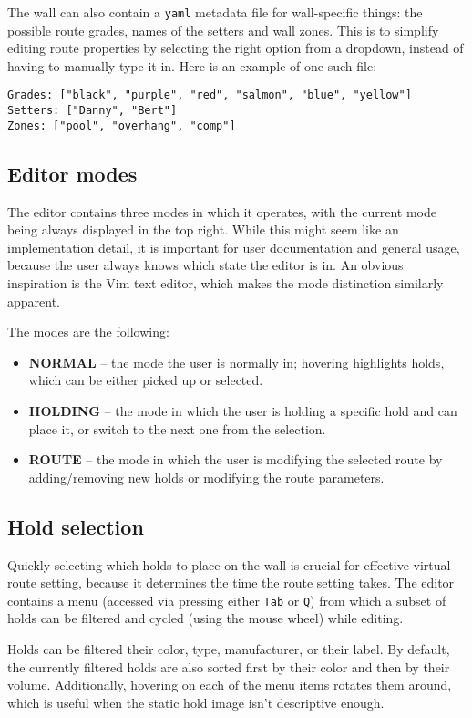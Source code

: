 The wall can also contain a \verb|yaml| metadata file for wall-specific things: the possible route grades, names of the setters and wall zones.
This is to simplify editing route properties by selecting the right option from a dropdown, instead of having to manually type it in.
Here is an example of one such file:

\begin{verbatim}
Grades: ["black", "purple", "red", "salmon", "blue", "yellow"]
Setters: ["Danny", "Bert"]
Zones: ["pool", "overhang", "comp"]
\end{verbatim}

\subsection{Editor modes}
The editor contains three modes in which it operates, with the current mode being always displayed in the top right.
While this might seem like an implementation detail, it is important for user documentation and general usage, because the user always knows which state the editor is in.
An obvious inspiration is the Vim text editor, which makes the mode distinction similarly apparent.

The modes are the following:

\begin{itemize}
	\item \textbf{NORMAL} -- the mode the user is normally in; hovering highlights holds, which can be either picked up or selected.
	\item \textbf{HOLDING} -- the mode in which the user is holding a specific hold and can place it, or switch to the next one from the selection.
	\item \textbf{ROUTE} -- the mode in which the user is modifying the selected route by adding/removing new holds or modifying the route parameters.
\end{itemize}

\subsection{Hold selection}
Quickly selecting which holds to place on the wall is crucial for effective virtual route setting, because it determines the time the route setting takes.
The editor contains a menu (accessed via pressing either \verb|Tab| or \verb|Q|) from which a subset of holds can be filtered and cycled (using the mouse wheel) while editing.

Holds can be filtered their color, type, manufacturer, or their label.
By default, the currently filtered holds are also sorted first by their color and then by their volume.
Additionally, hovering on each of the menu items rotates them around, which is useful when the static hold image isn't descriptive enough.

